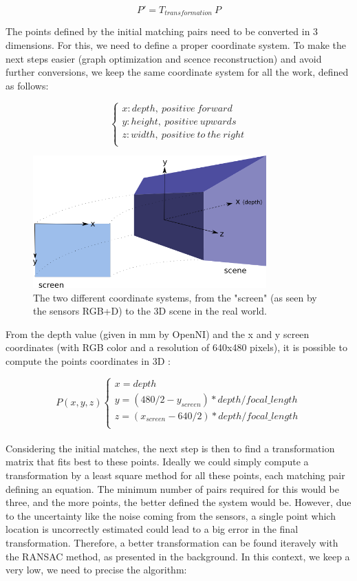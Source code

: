 \[
P' = T_{transformation} \: P
\]

The points defined by the initial matching pairs need to be converted in 3 dimensions. For this, we need to define a proper coordinate system. To make the next steps easier (graph optimization and scence reconstruction) and avoid further conversions, we keep the same coordinate system for all the work, defined as follows:

\[
\left\{\begin{array}{l}
x: depth,\:positive\:forward\\
y: height,\:positive\:upwards\\
z: width,\:positive\:to\:the\:right\\
\end{array}
\right.
\]

\begin{figure}[h!]
\centering
\includegraphics[width=0.8\textwidth]{figures/coordinates}
\caption{The two different coordinate systems, from the "screen" (as seen by the sensors RGB+D) to the 3D scene in the real world.}
\end{figure}

From the depth value (given in mm by OpenNI) and the x and y screen coordinates (with RGB color and a resolution of 640x480 pixels), it is possible to compute the points coordinates in 3D :

\[
P(x,y,z)\left\{
\begin{array}{l}
x = depth \\
y = (480/2 - y_{screen}) * depth / focal\_length \\
z = (x_{screen} - 640/2) * depth / focal\_length \\
\end{array}
\right.
\]

\paragraph{}
Considering the initial matches, the next step is then to find a transformation matrix that fits best to these points. Ideally we could simply compute a transformation by a least square method for all these points, each matching pair defining an equation. The minimum number of pairs required for this would be three, and the more points, the better defined the system would be. However, due to the uncertainty like the noise coming from the sensors, a single point which location is uncorrectly estimated could lead to a big error in the final transformation. Therefore, a better transformation can be found iteravely with the RANSAC method, as presented in the background. In this context, we keep a very low, we need to precise the algorithm:

